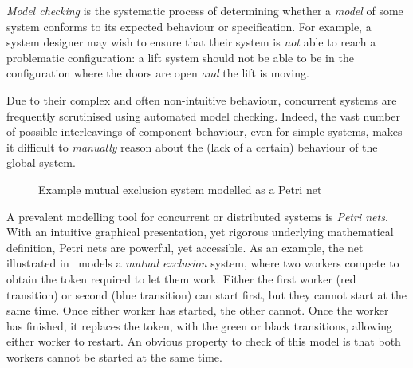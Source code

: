 \emph{Model checking} is the systematic process of determining whether a
\emph{model} of some system conforms to its expected behaviour or
specification. For example, a system designer may wish to ensure that their
system is \emph{not} able to reach a problematic configuration: a lift system
should not be able to be in the configuration where the doors are open
\emph{and} the lift is moving.

Due to their complex and often non-intuitive behaviour, concurrent systems are
frequently scrutinised using automated model checking. Indeed, the vast number
of possible interleavings of component behaviour, even for simple systems,
makes it difficult to \emph{manually} reason about the (lack of a certain)
behaviour of the global system.

\begin{figure}[ht]
\centering
{}
\caption{Example mutual exclusion system modelled as a Petri net}
\label{fig:mutexNet}
\end{figure}

A prevalent modelling tool for concurrent or distributed systems is \emph{Petri
nets}. With an intuitive graphical presentation, yet rigorous underlying
mathematical definition, Petri nets are powerful, yet accessible. As an
example, the net illustrated in~ models a \emph{mutual
exclusion} system, where two workers compete to obtain the token required to
let them work. Either the first worker (red transition) or second (blue
transition) can start first, but they cannot start at the same time. Once
either worker has started, the other cannot. Once the worker has
finished, it replaces the token, with the green or black transitions, allowing
either worker to restart. An obvious property to check of this model is that
both workers cannot be started at the same time.

